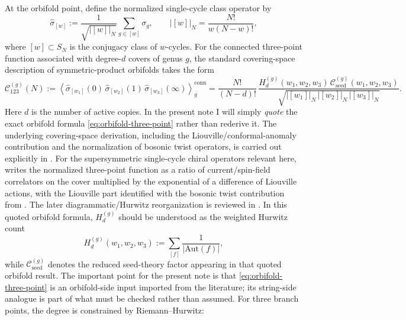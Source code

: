 \documentclass[11pt]{article}
\newcommand{\mc}[1]{\mathcal{#1}}
\begin{document}
At the orbifold point, define the normalized single-cycle class operator by
\begin{equation}\label{eq:class-operator}
\widehat{\sigma}_{[w]}
:=
\frac{1}{\sqrt{|[w]|_N}}
\sum_{g\in [w]}\sigma_g,
\qquad
|[w]|_N=\frac{N!}{w(N-w)!},
\end{equation}
where $[w]\subset S_N$ is the conjugacy class of $w$-cycles. For the connected three-point function associated with degree-$d$ covers of genus $g$, the standard covering-space description of symmetric-product orbifolds takes the form \cite{arutyunov1998orbifoldscattering,lunin2001correlationorbifolds,lunin2002threepointorbifolds,pakman2009diagramssymmetricorbifold,pakman2009extremalhurwitz}
\begin{equation}\label{eq:orbifold-three-point}
\mc C_{123}^{(g)}(N)
:=
\left\langle
\widehat{\sigma}_{[w_1]}(0)\,
\widehat{\sigma}_{[w_2]}(1)\,
\widehat{\sigma}_{[w_3]}(\infty)
\right\rangle_{g}^{\mathrm{conn}}
=
\frac{N!}{(N-d)!}\,
\frac{
H_d^{(g)}(w_1,w_2,w_3)\,
\mc C_{\mathrm{seed}}^{(g)}(w_1,w_2,w_3)
}{
\sqrt{|[w_1]|_N\,|[w_2]|_N\,|[w_3]|_N}
}.
\end{equation}
Here $d$ is the number of active copies. In the present note I will simply \emph{quote} the exact orbifold formula \eqref{eq:orbifold-three-point} rather than rederive it. The underlying covering-space derivation, including the Liouville/conformal-anomaly contribution and the normalization of bosonic twist operators, is carried out explicitly in \cite[Secs.~5--6]{lunin2001correlationorbifolds}. For the supersymmetric single-cycle chiral operators relevant here, \cite[Sec.~4]{lunin2002threepointorbifolds} writes the normalized three-point function as a ratio of current/spin-field correlators on the cover multiplied by the exponential of a difference of Liouville actions, with the Liouville part identified with the bosonic twist contribution from \cite{lunin2001correlationorbifolds}. The later diagrammatic/Hurwitz reorganization is reviewed in \cite{pakman2009diagramssymmetricorbifold}. In this quoted orbifold formula, $H_d^{(g)}$ should be understood as the weighted Hurwitz count
\begin{equation}\label{eq:weighted-hurwitz-count}
H_d^{(g)}(w_1,w_2,w_3)
:=
\sum_{[f]}
\frac{1}{|\mathrm{Aut}(f)|},
\end{equation}
while $\mc C_{\mathrm{seed}}^{(g)}$ denotes the reduced seed-theory factor appearing in that quoted orbifold result. The important point for the present note is that \eqref{eq:orbifold-three-point} is an orbifold-side input imported from the literature; its string-side analogue is part of what must be checked rather than assumed. For three branch points, the degree is constrained by Riemann--Hurwitz:
\end{document}
